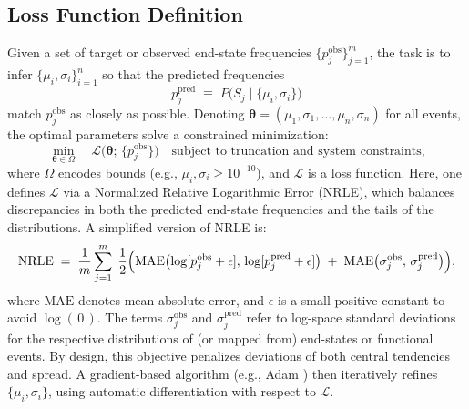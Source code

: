 \subsection{Loss Function Definition}
Given a set of target or observed end-state frequencies \(\{p_{j}^{\mathrm{obs}}\}_{j=1}^m\), the task is to infer \(\{\mu_i,\sigma_i\}_{i=1}^n\) so that the predicted frequencies 
\[
p_{j}^{\mathrm{pred}}\;\equiv\;P\bigl(S_j \mid \{\mu_i,\sigma_i\}\bigr)
\]
match \(p_{j}^{\mathrm{obs}}\) as closely as possible. Denoting \(\boldsymbol{\theta}=(\mu_1,\sigma_1,\dots,\mu_n,\sigma_n)\) for all events, the optimal parameters solve a constrained minimization:
\begin{equation}
\label{eq:ebr2_optimization}
\min_{\boldsymbol{\theta}\in\Omega}
\quad
\mathcal{L}\bigl(\boldsymbol{\theta};\,\{p_{j}^{\mathrm{obs}}\}\bigr)
\quad
\text{subject to truncation and system constraints,}
\end{equation}
where \(\Omega\) encodes bounds (e.g., \(\mu_i,\sigma_i \ge 10^{-10}\)), and \(\mathcal{L}\) is a loss function. Here, one defines \(\mathcal{L}\) via a Normalized Relative Logarithmic Error (NRLE), which balances discrepancies in both the predicted end-state frequencies and the tails of the distributions. A simplified version of NRLE is:
\begin{equation}
\label{eq:ebr2_nrle}
\text{NRLE} 
\;=\;
\frac{1}{m}
\sum_{j=1}^{m}
\;\frac{1}{2}
\Bigl(
  \text{MAE}\bigl(\log[p_{j}^{\mathrm{obs}}+\epsilon],\,\log[p_{j}^{\mathrm{pred}}+\epsilon]\bigr)
  \;+\;
  \text{MAE}\bigl(\sigma_{j}^{\mathrm{obs}},\,\sigma_{j}^{\mathrm{pred}}\bigr)
\Bigr),
\end{equation}
where \(\text{MAE}\) denotes mean absolute error, and \(\epsilon\) is a small positive constant to avoid \(\log(\,0\,)\). The terms \(\sigma_{j}^{\mathrm{obs}}\) and \(\sigma_{j}^{\mathrm{pred}}\) refer to log-space standard deviations for the respective distributions of (or mapped from) end-states or functional events. By design, this objective penalizes deviations of both central tendencies and spread. A gradient-based algorithm (e.g., Adam \cite{zhang_improved_2018}) then iteratively refines \(\{\mu_i,\sigma_i\}\), using automatic differentiation with respect to \(\mathcal{L}\).
